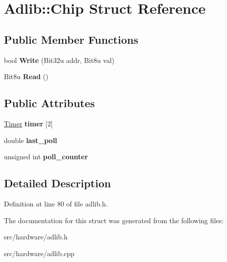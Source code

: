 \hypertarget{structAdlib_1_1Chip}{\section{Adlib\-:\-:Chip Struct Reference}
\label{structAdlib_1_1Chip}
}
\subsection*{Public Member Functions}
\begin{DoxyCompactItemize}
\item 
\hypertarget{structAdlib_1_1Chip_ad28b029cb4ec56ff900b160c00accad0}{bool {\bfseries Write} (Bit32u addr, Bit8u val)}\label{structAdlib_1_1Chip_ad28b029cb4ec56ff900b160c00accad0}

\item 
\hypertarget{structAdlib_1_1Chip_a472381a44ada102a7df220a9d16d002f}{Bit8u {\bfseries Read} ()}\label{structAdlib_1_1Chip_a472381a44ada102a7df220a9d16d002f}

\end{DoxyCompactItemize}
\subsection*{Public Attributes}
\begin{DoxyCompactItemize}
\item 
\hypertarget{structAdlib_1_1Chip_a98d53752542a19e358f02a3da4cf473e}{\hyperlink{structAdlib_1_1Timer}{Timer} {\bfseries timer} \mbox{[}2\mbox{]}}\label{structAdlib_1_1Chip_a98d53752542a19e358f02a3da4cf473e}

\item 
\hypertarget{structAdlib_1_1Chip_ac92c16633c6051b3b9721944a809925c}{double {\bfseries last\-\_\-poll}}\label{structAdlib_1_1Chip_ac92c16633c6051b3b9721944a809925c}

\item 
\hypertarget{structAdlib_1_1Chip_a0f964ac7fe648a9302e5c0ba219fb7da}{unsigned int {\bfseries poll\-\_\-counter}}\label{structAdlib_1_1Chip_a0f964ac7fe648a9302e5c0ba219fb7da}

\end{DoxyCompactItemize}


\subsection{Detailed Description}


Definition at line 80 of file adlib.\-h.



The documentation for this struct was generated from the following files\-:\begin{DoxyCompactItemize}
\item 
src/hardware/adlib.\-h\item 
src/hardware/adlib.\-cpp\end{DoxyCompactItemize}
